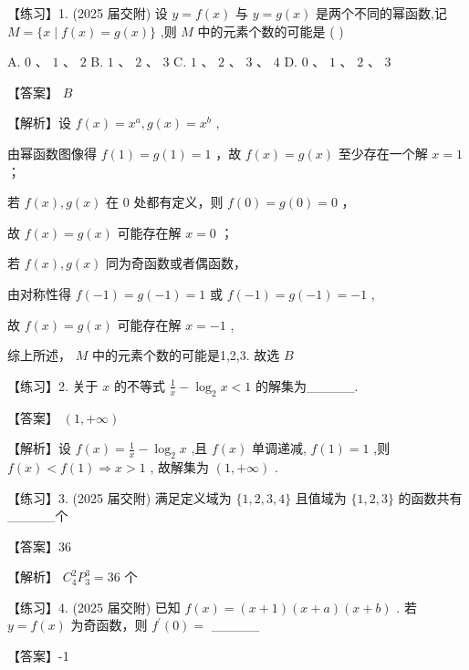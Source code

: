 \documentclass[10pt]{article}
\newcommand*\circled[1]{\tikz[baseline=(char.base)]{\node[shape=circle,draw,inner sep=1.5pt] (char) {\small #1};}}
\begin{document}
【练习】1. (2025 届交附) 设 \(y = f\left( x\right)\) 与 \(y = g\left( x\right)\) 是两个不同的幂函数,记 \(M = \{ x \mid  f\left( x\right)  = g\left( x\right) \}\) ,则 \(M\) 中的元素个数的可能是 ( )

A. \(0\text{ 、 }1\text{ 、 }2\) B. \(1\text{ 、 }2\text{ 、 }3\) C. \(1\text{ 、 }2\text{ 、 }3\text{ 、 }4\) D. \(0\text{ 、 }1\text{ 、 }2\text{ 、 }3\)

【答案】 \(B\)

【解析】设 \(f\left( x\right)  = {x}^{a},g\left( x\right)  = {x}^{b}\) ,

 \circled{1}  由幂函数图像得 \(f\left( 1\right)  = g\left( 1\right)  = 1\) ，故 \(f\left( x\right)  = g\left( x\right)\) 至少存在一个解 \(x = 1\) ；

 \circled{2} 若 \(f\left( x\right) ,g\left( x\right)\) 在 0 处都有定义，则 \(f\left( 0\right)  = g\left( 0\right)  = 0\) ，

故 \(f\left( x\right)  = g\left( x\right)\) 可能存在解 \(x = 0\) ；

 \circled{3} 若 \(f\left( x\right) ,g\left( x\right)\) 同为奇函数或者偶函数，

由对称性得 \(f\left( {-1}\right)  = g\left( {-1}\right)  = 1\) 或 \(f\left( {-1}\right)  = g\left( {-1}\right)  =  - 1\) ,

故 \(f\left( x\right)  = g\left( x\right)\) 可能存在解 \(x =  - 1\) ,

综上所述， \(M\) 中的元素个数的可能是1,2,3. 故选 \(B\)

【练习】2. 关于 \(x\) 的不等式 \(\frac{1}{x} - {\log }_{2}x < 1\) 的解集为\_\_\_\_\_.

【答案】 \(\left( {1, + \infty }\right)\)

【解析】设 \(f\left( x\right)  = \frac{1}{x} - {\log }_{2}x\) ,且 \(f\left( x\right)\) 单调递减, \(f\left( 1\right)  = 1\) ,则 \(f\left( x\right)  < f\left( 1\right)  \Rightarrow  x > 1\) , 故解集为 \(\left( {1, + \infty }\right)\) .

【练习】3. (2025 届交附) 满足定义域为 \(\{ 1,2,3,4\}\) 且值域为 \(\{ 1,2,3\}\) 的函数共有\_\_\_\_\_个

【答案】36

【解析】 \({C}_{4}^{2}{P}_{3}^{3} = {36}\) 个

【练习】4. (2025 届交附) 已知 \(f\left( x\right)  = \left( {x + 1}\right) \left( {x + a}\right) \left( {x + b}\right)\) . 若 \(y = f\left( x\right)\) 为奇函数，则 \({f}^{\prime }\left( 0\right)  =\) \_\_\_\_\_

【答案】-1
\end{document}
